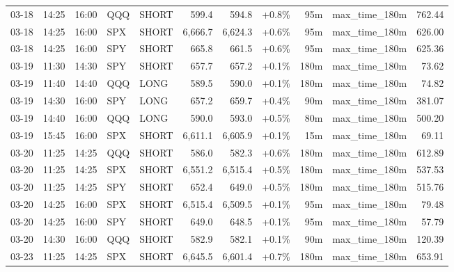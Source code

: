 \documentclass[11pt,a4paper,twoside]{article}
\begin{document}
\begin{center}
\begin{longtable}{>{\color{txtmain}}l l l l l r r r r >{\color{txtmain}}l r}
03-18 & 14:25 & 16:00 & QQQ & SHORT & 599.4 & 594.8 & \textcolor{wingreen}{+0.8\%} & 95m & max\_time\_180m & \textcolor{wingreen}{762.44} \\
03-18 & 14:25 & 16:00 & SPX & SHORT & 6,666.7 & 6,624.3 & \textcolor{wingreen}{+0.6\%} & 95m & max\_time\_180m & \textcolor{wingreen}{626.00} \\
03-18 & 14:25 & 16:00 & SPY & SHORT & 665.8 & 661.5 & \textcolor{wingreen}{+0.6\%} & 95m & max\_time\_180m & \textcolor{wingreen}{625.36} \\
03-19 & 11:30 & 14:30 & SPY & SHORT & 657.7 & 657.2 & \textcolor{wingreen}{+0.1\%} & 180m & max\_time\_180m & \textcolor{wingreen}{73.62} \\
03-19 & 11:40 & 14:40 & QQQ & LONG & 589.5 & 590.0 & \textcolor{wingreen}{+0.1\%} & 180m & max\_time\_180m & \textcolor{wingreen}{74.82} \\
03-19 & 14:30 & 16:00 & SPY & LONG & 657.2 & 659.7 & \textcolor{wingreen}{+0.4\%} & 90m & max\_time\_180m & \textcolor{wingreen}{381.07} \\
03-19 & 14:40 & 16:00 & QQQ & LONG & 590.0 & 593.0 & \textcolor{wingreen}{+0.5\%} & 80m & max\_time\_180m & \textcolor{wingreen}{500.20} \\
03-19 & 15:45 & 16:00 & SPX & SHORT & 6,611.1 & 6,605.9 & \textcolor{wingreen}{+0.1\%} & 15m & max\_time\_180m & \textcolor{wingreen}{69.11} \\
03-20 & 11:25 & 14:25 & QQQ & SHORT & 586.0 & 582.3 & \textcolor{wingreen}{+0.6\%} & 180m & max\_time\_180m & \textcolor{wingreen}{612.89} \\
03-20 & 11:25 & 14:25 & SPX & SHORT & 6,551.2 & 6,515.4 & \textcolor{wingreen}{+0.5\%} & 180m & max\_time\_180m & \textcolor{wingreen}{537.53} \\
03-20 & 11:25 & 14:25 & SPY & SHORT & 652.4 & 649.0 & \textcolor{wingreen}{+0.5\%} & 180m & max\_time\_180m & \textcolor{wingreen}{515.76} \\
03-20 & 14:25 & 16:00 & SPX & SHORT & 6,515.4 & 6,509.5 & \textcolor{wingreen}{+0.1\%} & 95m & max\_time\_180m & \textcolor{wingreen}{79.48} \\
03-20 & 14:25 & 16:00 & SPY & SHORT & 649.0 & 648.5 & \textcolor{wingreen}{+0.1\%} & 95m & max\_time\_180m & \textcolor{wingreen}{57.79} \\
03-20 & 14:30 & 16:00 & QQQ & SHORT & 582.9 & 582.1 & \textcolor{wingreen}{+0.1\%} & 90m & max\_time\_180m & \textcolor{wingreen}{120.39} \\
03-23 & 11:25 & 14:25 & SPX & SHORT & 6,645.5 & 6,601.4 & \textcolor{wingreen}{+0.7\%} & 180m & max\_time\_180m & \textcolor{wingreen}{653.91} \\

\end{longtable}
\end{center}
\end{document}
